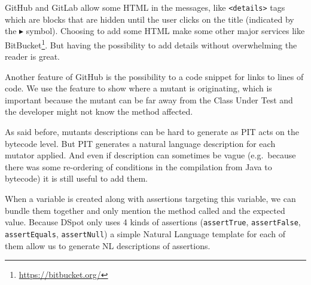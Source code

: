 \documentclass[a4paper,11pt]{sdm_internship}
\newcommand{\dspot}{DSpot\xspace}
\theoremstyle{definition}
\begin{document}
\begin{appendices}
GitHub and GitLab allow some HTML in the messages, like \texttt{<details>} tags which are blocks that are hidden until the user clicks on the title (indicated by the $\blacktriangleright$ symbol).
Choosing to add some HTML make some other major services like BitBucket\footnote{\url{https://bitbucket.org/}}.
But having the possibility to add details without overwhelming the reader is great.

Another feature of GitHub is the possibility to a code snippet for links to lines of code.
We use the feature to show where a mutant is originating, which is important because the mutant can be far away from the Class Under Test and the developer might not know the method affected.

As said before, mutants descriptions can be hard to generate as PIT acts on the bytecode level.
But PIT generates a natural language description for each mutator applied.
And even if description can sometimes be vague (e.g.\ because there was some re-ordering of conditions in the compilation from Java to bytecode) it is still useful to add them.


When a variable is created along with assertions targeting this variable, we can bundle them together and only mention the method called and the expected value.
Because \dspot{} only uses 4 kinds of assertions (\texttt{assertTrue}, \texttt{assertFalse}, \texttt{assertEquals}, \texttt{assertNull}) a simple Natural Language template for each of them allow us to generate NL descriptions of assertions.

\end{appendices}
\end{document}
